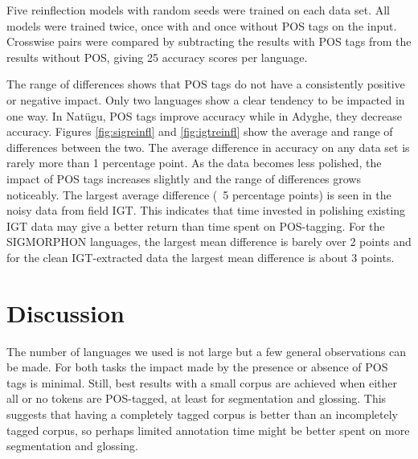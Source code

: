 Five reinflection models with random seeds were trained on each data set. All models were trained twice, once with and once without POS tags on the input. Crosswise pairs were compared by subtracting the results with POS tags from the results without POS, giving 25 accuracy scores per language. 

The range of differences shows that POS tags do not have a consistently positive or negative impact. Only two languages show a clear tendency to be impacted in one way. In Nat\"ugu, POS tags improve accuracy while in Adyghe, they decrease accuracy. Figures \ref{fig:sigreinfl} and \ref{fig:igtreinfl} show the average and range of differences between the two. The average difference in accuracy on any data set is rarely more than 1 percentage point. As the data becomes less polished, the impact of POS tags increases slightly and the range of differences grows noticeably. The largest average difference (~5 percentage points) is seen in the noisy data from field IGT. This indicates that time invested in polishing existing IGT data may give a better return than time spent on POS-tagging. For the SIGMORPHON languages, the largest mean difference is barely over 2 points and for the clean IGT-extracted data the largest mean difference is about 3 points. 



\section{Discussion}
\label{sec:posdiscussion}

The number of languages we used is not large but a few general observations can be made. For both tasks the impact made by the presence or absence of POS tags is minimal. 
Still, best results with a small corpus are achieved when either all or no tokens are POS-tagged, at least for segmentation and glossing. This suggests that having a completely tagged corpus is better than an incompletely tagged corpus, so perhaps limited annotation time might be better spent on more segmentation and glossing. 

